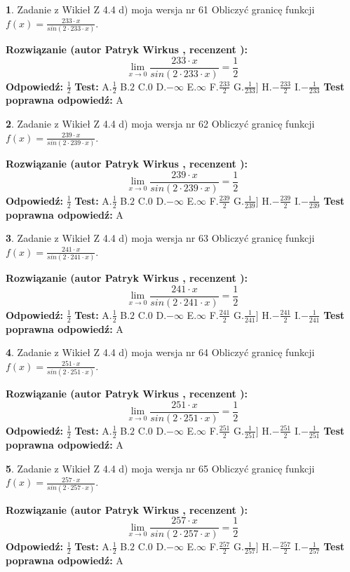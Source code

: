 \documentclass[12pt, a4paper]{article}
\theoremstyle{definition} %
\newtheorem{zad}{}
\newcommand{\zadStart}[1]{\begin{zad}#1\newline}
\newcommand{\zadStop}{\end{zad}}
\newcommand{\rozwStart}[2]{\noindent \textbf{Rozwiązanie (autor #1 , recenzent #2): }\newline}
\newcommand{\rozwStop}{\newline}
\newcommand{\odpStart}{\noindent \textbf{Odpowiedź:}\newline}
\newcommand{\odpStop}{\newline}
\newcommand{\testStart}{\noindent \textbf{Test:}\newline}
\newcommand{\testStop}{\newline}
\newcommand{\kluczStart}{\noindent \textbf{Test poprawna odpowiedź:}\newline}
\newcommand{\kluczStop}{\newline}
\begin{document}
\zadStart{Zadanie z Wikieł Z 4.4 d) moja wersja nr 61}
Obliczyć granicę funkcji $f(x)=\frac{233\cdot x}{sin(2 \cdot233\cdot x)}$.
\zadStop
\rozwStart{Patryk Wirkus}{}
$$\lim\limits_{x\to 0}\frac{233\cdot x}{sin(2 \cdot233\cdot x)}=\frac{1}{2}$$
\rozwStop
\odpStart
$\frac{1}{2}$
\odpStop
\testStart
A.$\frac{1}{2}$
B.$2$
C.$0$
D.$-\infty$
E.$\infty$
F.$\frac{233}{2}$
G.$\frac{1}{233}]$
H.$-\frac{233}{2}$
I.$-\frac{1}{233}$
\testStop
\kluczStart
A
\kluczStop



\zadStart{Zadanie z Wikieł Z 4.4 d) moja wersja nr 62}
Obliczyć granicę funkcji $f(x)=\frac{239\cdot x}{sin(2 \cdot239\cdot x)}$.
\zadStop
\rozwStart{Patryk Wirkus}{}
$$\lim\limits_{x\to 0}\frac{239\cdot x}{sin(2 \cdot239\cdot x)}=\frac{1}{2}$$
\rozwStop
\odpStart
$\frac{1}{2}$
\odpStop
\testStart
A.$\frac{1}{2}$
B.$2$
C.$0$
D.$-\infty$
E.$\infty$
F.$\frac{239}{2}$
G.$\frac{1}{239}]$
H.$-\frac{239}{2}$
I.$-\frac{1}{239}$
\testStop
\kluczStart
A
\kluczStop



\zadStart{Zadanie z Wikieł Z 4.4 d) moja wersja nr 63}
Obliczyć granicę funkcji $f(x)=\frac{241\cdot x}{sin(2 \cdot241\cdot x)}$.
\zadStop
\rozwStart{Patryk Wirkus}{}
$$\lim\limits_{x\to 0}\frac{241\cdot x}{sin(2 \cdot241\cdot x)}=\frac{1}{2}$$
\rozwStop
\odpStart
$\frac{1}{2}$
\odpStop
\testStart
A.$\frac{1}{2}$
B.$2$
C.$0$
D.$-\infty$
E.$\infty$
F.$\frac{241}{2}$
G.$\frac{1}{241}]$
H.$-\frac{241}{2}$
I.$-\frac{1}{241}$
\testStop
\kluczStart
A
\kluczStop



\zadStart{Zadanie z Wikieł Z 4.4 d) moja wersja nr 64}
Obliczyć granicę funkcji $f(x)=\frac{251\cdot x}{sin(2 \cdot251\cdot x)}$.
\zadStop
\rozwStart{Patryk Wirkus}{}
$$\lim\limits_{x\to 0}\frac{251\cdot x}{sin(2 \cdot251\cdot x)}=\frac{1}{2}$$
\rozwStop
\odpStart
$\frac{1}{2}$
\odpStop
\testStart
A.$\frac{1}{2}$
B.$2$
C.$0$
D.$-\infty$
E.$\infty$
F.$\frac{251}{2}$
G.$\frac{1}{251}]$
H.$-\frac{251}{2}$
I.$-\frac{1}{251}$
\testStop
\kluczStart
A
\kluczStop



\zadStart{Zadanie z Wikieł Z 4.4 d) moja wersja nr 65}
Obliczyć granicę funkcji $f(x)=\frac{257\cdot x}{sin(2 \cdot257\cdot x)}$.
\zadStop
\rozwStart{Patryk Wirkus}{}
$$\lim\limits_{x\to 0}\frac{257\cdot x}{sin(2 \cdot257\cdot x)}=\frac{1}{2}$$
\rozwStop
\odpStart
$\frac{1}{2}$
\odpStop
\testStart
A.$\frac{1}{2}$
B.$2$
C.$0$
D.$-\infty$
E.$\infty$
F.$\frac{257}{2}$
G.$\frac{1}{257}]$
H.$-\frac{257}{2}$
I.$-\frac{1}{257}$
\testStop
\kluczStart
A
\kluczStop
\end{document}
